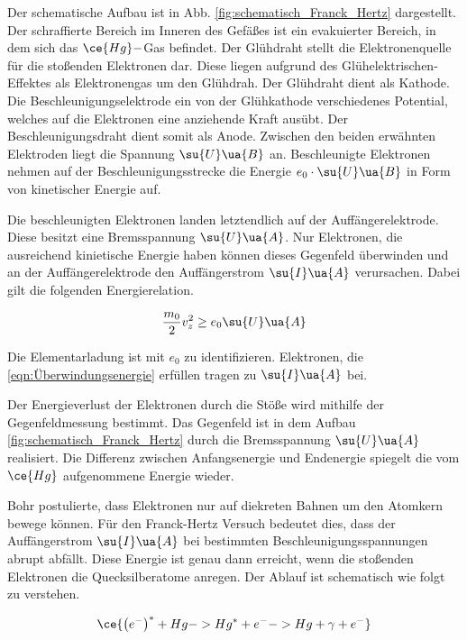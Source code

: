 Der schematische Aufbau ist in Abb. \ref{fig:schematisch_Franck_Hertz}
dargestellt.
Der schraffierte Bereich im Inneren des Gefäßes ist ein evakuierter Bereich, in dem sich
das $\ce{Hg}-$Gas befindet. Der Glühdraht stellt die Elektronenquelle für
die stoßenden Elektronen dar. Diese liegen aufgrund des Glühelektrischen-Effektes
als Elektronengas um den Glühdrah. Der Glühdraht dient als Kathode.
Die Beschleunigungselektrode ein von der Glühkathode verschiedenes Potential,
welches auf die Elektronen eine anziehende Kraft ausübt. Der Beschleunigungsdraht
dient somit als Anode. Zwischen den beiden erwähnten Elektroden liegt die
Spannung $\su{U}\ua{B}$ an.
Beschleunigte Elektronen nehmen auf der Beschleunigungsstrecke die Energie
$e_0 \cdot\su{U}\ua{B}$ in Form von kinetischer Energie auf.

Die beschleunigten Elektronen landen letztendlich auf der Auffängerelektrode.
Diese besitzt eine Bremsspannung $\su{U}\ua{A}$.
Nur Elektronen, die ausreichend kinietische Energie haben können dieses
Gegenfeld überwinden und an der Auffängerelektrode den Auffängerstrom $\su{I}\ua{A}$
verursachen. Dabei gilt die folgenden Energierelation.

\begin{equation}
  \label{eqn:Überwindungsenergie}
  \frac{m_0}{2}v_z^2 \geq e_0 \su{U}\ua{A}
\end{equation}

Die Elementarladung ist mit $e_0$ zu identifizieren.
Elektronen, die \eqref{eqn:Überwindungsenergie} erfüllen tragen zu
$\su{I}\ua{A}$ bei.

Der Energieverlust der Elektronen durch die Stöße wird mithilfe der Gegenfeldmessung
bestimmt. Das Gegenfeld ist in dem Aufbau \ref{fig:schematisch_Franck_Hertz}
durch die Bremsspannung $\su{U}\ua{A}$ realisiert.
Die Differenz zwischen Anfangsenergie und Endenergie spiegelt die
vom $\ce{Hg}$ aufgenommene Energie wieder.

Bohr postulierte, dass Elektronen nur auf diekreten Bahnen um den Atomkern bewege können.
Für den Franck-Hertz Versuch bedeutet dies, dass der Auffängerstrom
$\su{I}\ua{A}$ bei bestimmten Beschleunigungsspannungen abrupt abfällt.
Diese Energie ist genau dann erreicht, wenn die stoßenden Elektronen
die Quecksilberatome anregen. Der Ablauf ist schematisch wie folgt zu verstehen.

\begin{equation}
  \label{eqn:Reaktionsgleichung}
  \ce{\left(e^-\right)^* + Hg -> Hg^* + e^- -> Hg + \gamma + e^-}
\end{equation}


